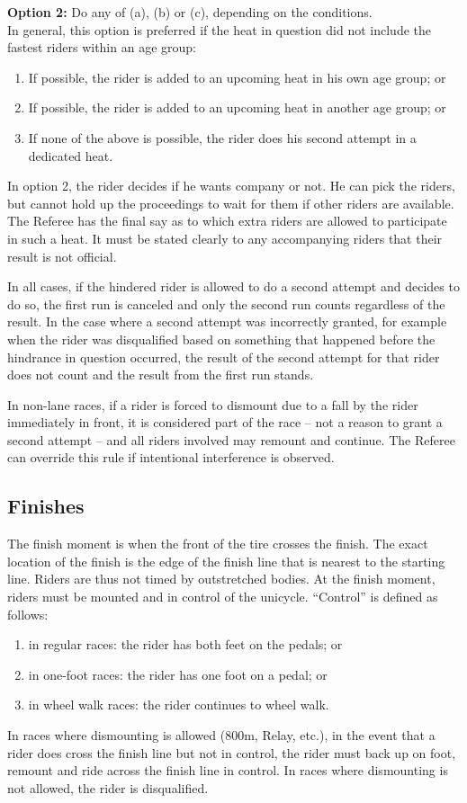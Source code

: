\textbf{Option 2:}
Do any of (a), (b) or (c), depending on the conditions.\\
In general, this option is preferred if the heat in question did not include the fastest riders within an age group:
\begin{enumerate}[label=(\alph*)]
\item If possible, the rider is added to an upcoming heat in his own age group; or
\item If possible, the rider is added to an upcoming heat in another age group; or
\item If none of the above is possible, the rider does his second attempt in a dedicated heat.
\end{enumerate}
In option 2, the rider decides if he wants company or not.
He can pick the riders, but cannot hold up the proceedings to wait for them if other riders are available.
The Referee has the final say as to which extra riders are allowed to participate in such a heat.
It must be stated clearly to any accompanying riders that their result is not official.

In all cases, if the hindered rider is allowed to do a second attempt and decides to do so, the first run is canceled and only the second run counts regardless of the result.
In the case where a second attempt was incorrectly granted, for example when the rider was disqualified based on something that happened before the hindrance in question occurred, the result of the second attempt for that rider does not count and the result from the first run stands.

In non-lane races, if a rider is forced to dismount due to a fall by the rider immediately in front, it is considered part of the race -- not a reason to grant a second attempt -- and all riders involved may remount and continue.
The Referee can override this rule if intentional interference is observed.

\subsection{Finishes \label{sec:track-field_finishes}}

The finish moment is when the front of the tire crosses the finish.
The exact location of the finish is the edge of the finish line that is nearest to the starting line.
Riders are thus not timed by outstretched bodies.
At the finish moment, riders must be mounted and in control of the unicycle.
``Control'' is defined as follows:
\begin{enumerate}[label=(\alph*)]
\item in regular races: the rider has both feet on the pedals; or
\item in one-foot races: the rider has one foot on a pedal; or
\item in wheel walk races: the rider continues to wheel walk.
\end{enumerate}
In races where dismounting is allowed (800m, Relay, etc.\@), in the event that a rider does cross the finish line but not in control, the rider must back up on foot, remount and ride across the finish line in control.
In races where dismounting is not allowed, the rider is disqualified.

